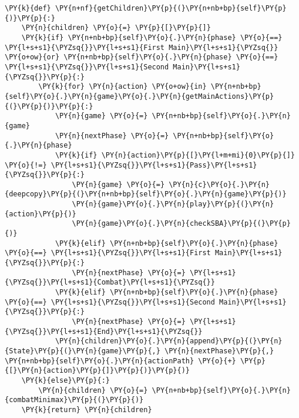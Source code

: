 \begin{Verbatim}[commandchars=\\\{\}]
\PY{k}{def} \PY{n+nf}{getChildren}\PY{p}{(}\PY{n+nb+bp}{self}\PY{p}{)}\PY{p}{:}
    \PY{n}{children} \PY{o}{=} \PY{p}{[}\PY{p}{]}
    \PY{k}{if} \PY{n+nb+bp}{self}\PY{o}{.}\PY{n}{phase} \PY{o}{==} \PY{l+s+s1}{\PYZsq{}}\PY{l+s+s1}{First Main}\PY{l+s+s1}{\PYZsq{}} \PY{o+ow}{or} \PY{n+nb+bp}{self}\PY{o}{.}\PY{n}{phase} \PY{o}{==} \PY{l+s+s1}{\PYZsq{}}\PY{l+s+s1}{Second Main}\PY{l+s+s1}{\PYZsq{}}\PY{p}{:}
        \PY{k}{for} \PY{n}{action} \PY{o+ow}{in} \PY{n+nb+bp}{self}\PY{o}{.}\PY{n}{game}\PY{o}{.}\PY{n}{getMainActions}\PY{p}{(}\PY{p}{)}\PY{p}{:}
            \PY{n}{game} \PY{o}{=} \PY{n+nb+bp}{self}\PY{o}{.}\PY{n}{game}
            \PY{n}{nextPhase} \PY{o}{=} \PY{n+nb+bp}{self}\PY{o}{.}\PY{n}{phase}
            \PY{k}{if} \PY{n}{action}\PY{p}{[}\PY{l+m+mi}{0}\PY{p}{]} \PY{o}{!=} \PY{l+s+s1}{\PYZsq{}}\PY{l+s+s1}{Pass}\PY{l+s+s1}{\PYZsq{}}\PY{p}{:}
                \PY{n}{game} \PY{o}{=} \PY{n}{c}\PY{o}{.}\PY{n}{deepcopy}\PY{p}{(}\PY{n+nb+bp}{self}\PY{o}{.}\PY{n}{game}\PY{p}{)}
                \PY{n}{game}\PY{o}{.}\PY{n}{play}\PY{p}{(}\PY{n}{action}\PY{p}{)}
                \PY{n}{game}\PY{o}{.}\PY{n}{checkSBA}\PY{p}{(}\PY{p}{)}
            \PY{k}{elif} \PY{n+nb+bp}{self}\PY{o}{.}\PY{n}{phase} \PY{o}{==} \PY{l+s+s1}{\PYZsq{}}\PY{l+s+s1}{First Main}\PY{l+s+s1}{\PYZsq{}}\PY{p}{:}
                \PY{n}{nextPhase} \PY{o}{=} \PY{l+s+s1}{\PYZsq{}}\PY{l+s+s1}{Combat}\PY{l+s+s1}{\PYZsq{}}
            \PY{k}{elif} \PY{n+nb+bp}{self}\PY{o}{.}\PY{n}{phase} \PY{o}{==} \PY{l+s+s1}{\PYZsq{}}\PY{l+s+s1}{Second Main}\PY{l+s+s1}{\PYZsq{}}\PY{p}{:}
                \PY{n}{nextPhase} \PY{o}{=} \PY{l+s+s1}{\PYZsq{}}\PY{l+s+s1}{End}\PY{l+s+s1}{\PYZsq{}}
            \PY{n}{children}\PY{o}{.}\PY{n}{append}\PY{p}{(}\PY{n}{State}\PY{p}{(}\PY{n}{game}\PY{p}{,} \PY{n}{nextPhase}\PY{p}{,} \PY{n+nb+bp}{self}\PY{o}{.}\PY{n}{actionPath} \PY{o}{+} \PY{p}{[}\PY{n}{action}\PY{p}{]}\PY{p}{)}\PY{p}{)}
    \PY{k}{else}\PY{p}{:}
        \PY{n}{children} \PY{o}{=} \PY{n+nb+bp}{self}\PY{o}{.}\PY{n}{combatMinimax}\PY{p}{(}\PY{p}{)}
    \PY{k}{return} \PY{n}{children}
\end{Verbatim}
